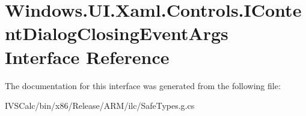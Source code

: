 \hypertarget{interface_windows_1_1_u_i_1_1_xaml_1_1_controls_1_1_i_content_dialog_closing_event_args}{}\section{Windows.\+U\+I.\+Xaml.\+Controls.\+I\+Content\+Dialog\+Closing\+Event\+Args Interface Reference}
\label{interface_windows_1_1_u_i_1_1_xaml_1_1_controls_1_1_i_content_dialog_closing_event_args}


The documentation for this interface was generated from the following file\+:\begin{DoxyCompactItemize}
\item 
I\+V\+S\+Calc/bin/x86/\+Release/\+A\+R\+M/ilc/Safe\+Types.\+g.\+cs\end{DoxyCompactItemize}
